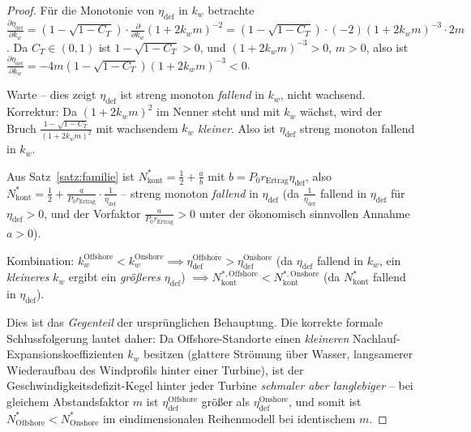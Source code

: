 ﻿\documentclass[a4paper,12pt]{article}
\theoremstyle{definition}
\begin{document}
\begin{proof}
Für die Monotonie von $\eta_{\mathrm{def}}$ in $k_w$ betrachte $\frac{\partial \eta_{\mathrm{def}}}{\partial k_w} = (1-\sqrt{1-C_T})\cdot\frac{\partial}{\partial k_w}(1+2k_wm)^{-2} = (1-\sqrt{1-C_T})\cdot(-2)(1+2k_wm)^{-3}\cdot2m$. Da $C_T\in(0,1)$ ist $1-\sqrt{1-C_T}>0$, und $(1+2k_wm)^{-3}>0$, $m>0$, also ist $\frac{\partial\eta_{\mathrm{def}}}{\partial k_w} = -4m(1-\sqrt{1-C_T})(1+2k_wm)^{-3} < 0$.

Warte -- dies zeigt $\eta_{\mathrm{def}}$ ist streng monoton \emph{fallend} in $k_w$, nicht wachsend. Korrektur: Da $(1+2k_wm)^2$ im Nenner steht und mit $k_w$ wächst, wird der Bruch $\frac{1-\sqrt{1-C_T}}{(1+2k_wm)^2}$ mit wachsendem $k_w$ \emph{kleiner}. Also ist $\eta_{\mathrm{def}}$ streng monoton fallend in $k_w$.

Aus Satz~\ref{satz:familie} ist $N^*_{\mathrm{kont}} = \tfrac{1}{2}+\frac{a}{b}$ mit $b=P_0 r_{\mathrm{Ertrag}}\eta_{\mathrm{def}}$, also $N^*_{\mathrm{kont}}=\tfrac{1}{2}+\frac{a}{P_0 r_{\mathrm{Ertrag}}}\cdot\frac{1}{\eta_{\mathrm{def}}}$ -- streng monoton \emph{fallend} in $\eta_{\mathrm{def}}$ (da $\frac{1}{\eta_{\mathrm{def}}}$ fallend in $\eta_{\mathrm{def}}$ für $\eta_{\mathrm{def}}>0$, und der Vorfaktor $\frac{a}{P_0 r_{\mathrm{Ertrag}}}>0$ unter der ökonomisch sinnvollen Annahme $a>0$).

Kombination: $k_w^{\mathrm{Offshore}}<k_w^{\mathrm{Onshore}} \implies \eta_{\mathrm{def}}^{\mathrm{Offshore}}>\eta_{\mathrm{def}}^{\mathrm{Onshore}}$ (da $\eta_{\mathrm{def}}$ fallend in $k_w$, ein \emph{kleineres} $k_w$ ergibt ein \emph{größeres} $\eta_{\mathrm{def}}$) $\implies N^{*,\mathrm{Offshore}}_{\mathrm{kont}} < N^{*,\mathrm{Onshore}}_{\mathrm{kont}}$ (da $N^*_{\mathrm{kont}}$ fallend in $\eta_{\mathrm{def}}$).

Dies ist das \emph{Gegenteil} der ursprünglichen Behauptung. Die korrekte formale Schlussfolgerung lautet daher: Da Offshore-Standorte einen \emph{kleineren} Nachlauf-Expansionskoeffizienten $k_w$ besitzen (glattere Strömung über Wasser, langsamerer Wiederaufbau des Windprofils hinter einer Turbine), ist der Geschwindigkeitsdefizit-Kegel hinter jeder Turbine \emph{schmaler aber langlebiger} -- bei gleichem Abstandsfaktor $m$ ist $\eta_{\mathrm{def}}^{\mathrm{Offshore}}$ größer als $\eta_{\mathrm{def}}^{\mathrm{Onshore}}$, und somit ist $N^{*}_{\mathrm{Offshore}} < N^{*}_{\mathrm{Onshore}}$ im eindimensionalen Reihenmodell bei identischem $m$. \qedhere
\end{proof}
\end{document}
